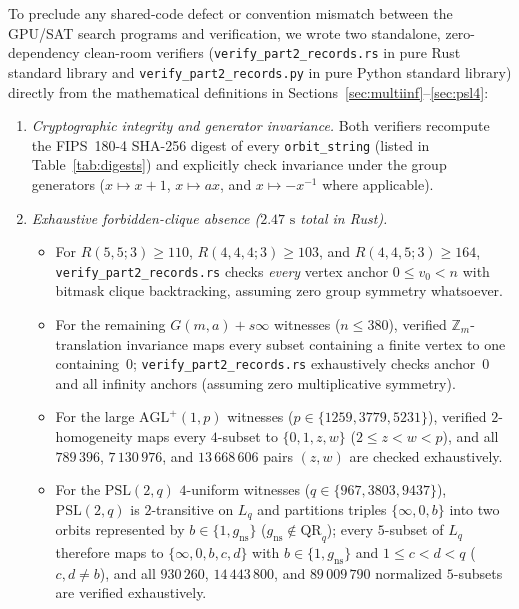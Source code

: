\documentclass[11pt]{article}
\theoremstyle{remark}
\newcommand{\Z}{\mathbb{Z}}
\begin{document}
To preclude any shared-code defect or convention mismatch between the GPU/SAT
search programs and verification, we wrote two standalone, zero-dependency
clean-room verifiers (\texttt{verify\_\allowbreak part2\_\allowbreak records.rs}
in pure Rust standard library and
\texttt{verify\_\allowbreak part2\_\allowbreak records.py} in pure Python
standard library) directly from the mathematical definitions in
Sections~\ref{sec:multiinf}--\ref{sec:psl4}:
\begin{enumerate}
\item \emph{Cryptographic integrity and generator invariance.} Both verifiers
  recompute the FIPS~180-4 SHA-256 digest of every \texttt{orbit\_string} (listed
  in Table~\ref{tab:digests}) and explicitly check invariance under the group
  generators ($x\mapsto x+1$, $x\mapsto ax$, and $x\mapsto -x^{-1}$ where
  applicable).
\item \emph{Exhaustive forbidden-clique absence ($2.47\text{ s}$ total in Rust).}
  \begin{itemize}
  \item For $R(5,5;3)\ge 110$, $R(4,4,4;3)\ge 103$, and $R(4,4,5;3)\ge 164$,
    \texttt{verify\_\allowbreak part2\_\allowbreak records.rs} checks \emph{every}
    vertex anchor $0\le v_0<n$ with bitmask clique backtracking, assuming zero
    group symmetry whatsoever.
  \item For the remaining $G(m,a)+s\infty$ witnesses ($n\le 380$), verified
    $\Z_m$-translation invariance maps every subset containing a finite vertex to
    one containing~$0$; \texttt{verify\_\allowbreak part2\_\allowbreak records.rs}
    exhaustively checks anchor~$0$ and all infinity anchors (assuming zero
    multiplicative symmetry).
  \item For the large $\mathrm{AGL}^+(1,p)$ witnesses ($p\in\{1259,3779,5231\}$),
    verified $2$-homogeneity maps every $4$-subset to $\{0,1,z,w\}$
    ($2\le z<w<p$), and all $789\,396$, $7\,130\,976$, and $13\,668\,606$ pairs
    $(z,w)$ are checked exhaustively.
  \item For the $\mathrm{PSL}(2,q)$ $4$-uniform witnesses
    ($q\in\{967,3803,9437\}$), $\mathrm{PSL}(2,q)$ is $2$-transitive on $L_q$
    and partitions triples $\{\infty,0,b\}$ into two orbits represented by
    $b\in\{1,g_{\mathrm{ns}}\}$ ($g_{\mathrm{ns}}\notin\mathrm{QR}_q$); every
    $5$-subset of $L_q$ therefore maps to $\{\infty,0,b,c,d\}$ with
    $b\in\{1,g_{\mathrm{ns}}\}$ and $1\le c<d<q$ ($c,d\ne b$), and all
    $930\,260$, $14\,443\,800$, and $89\,009\,790$ normalized $5$-subsets are
    verified exhaustively.
  \end{itemize}
\end{enumerate}
\end{document}
